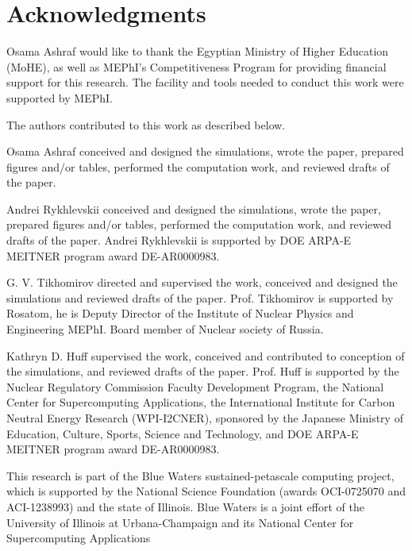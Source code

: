 \section{Acknowledgments}

Osama Ashraf would like to thank the Egyptian Ministry of Higher Education (MoHE), as well as MEPhI's Competitiveness Program for providing financial support for this research. The facility and tools needed to conduct this work were supported by MEPhI.

The authors contributed to this work as described below.

Osama Ashraf conceived and designed the simulations, wrote the paper, prepared figures 
and/or tables, performed the computation work, and reviewed drafts of the paper.

Andrei Rykhlevskii conceived and designed the simulations, wrote the paper, prepared figures 
and/or tables, performed the computation work, and reviewed drafts of the paper. Andrei Rykhlevskii 
is supported by  DOE ARPA-E MEITNER program award DE-AR0000983. 

G. V. Tikhomirov directed and supervised the work, conceived and designed the simulations and reviewed drafts of the paper. Prof. Tikhomirov is supported by Rosatom, he is Deputy Director of the Institute of Nuclear Physics and Engineering MEPhI. Board member of Nuclear society of Russia.

Kathryn D. Huff supervised the work, conceived and contributed to conception of the simulations, and reviewed drafts of the paper.  Prof. Huff is supported by the Nuclear Regulatory Commission Faculty Development Program, the National Center for Supercomputing Applications, the International Institute for Carbon Neutral Energy Research (WPI-I2CNER), 
sponsored by the Japanese Ministry of Education, Culture, Sports, Science and Technology, and  DOE ARPA-E MEITNER program award DE-AR0000983.

This research is part of the Blue Waters sustained-petascale computing project, 
which is supported by the National Science Foundation (awards OCI-0725070 and 
ACI-1238993) and the state of Illinois. Blue Waters is a joint effort of the 
University of Illinois at Urbana-Champaign and its National Center for 
Supercomputing Applications 
